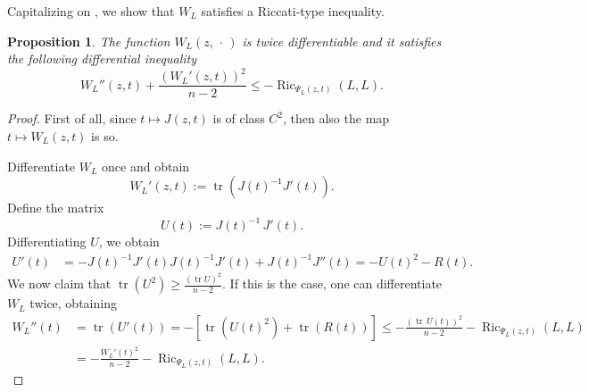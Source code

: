 \documentclass[12pt,a4paper]{amsart}
\theoremstyle{plain}
\newtheorem{proposition}[lemma]{Proposition}
\theoremstyle{definition}
\numberwithin{equation}{section}
\DeclareMathOperator{\Ric}{Ric}
\DeclareMathOperator{\tr}{tr}
\newcommand{\dotargument}{\,\cdot\,}
\newcommand{\gflow}{\Psi}
\begin{document}
Capitalizing on , 
we show that $W_{L}$ satisfies a
Riccati-type inequality.
%




\begin{proposition}
  \label{eq:riccati-for-jacobi}
  The function $W_{L}(z,\dotargument)$  is twice differentiable and it satisfies the following differential
  inequality
  \begin{equation}
    W_{L}''(z,t)
    +\frac{(W_{L}'(z,t))^2}{n-2}
    \leq
   - \Ric_{\gflow_L(z,t)}(L,L)
    .
  \end{equation}
\end{proposition}

\begin{proof}
First of all, since $t\mapsto J(z,t)$ is of class $C^2$, then also the map $t\mapsto W_L(z,t)$ is so.

Differentiate $W_{L}$ once and obtain
\begin{equation*}
  W_{L}'(z,t):=
  \tr(J(t)^{-1} J'(t))
  .
\end{equation*}
%
Define the matrix
\begin{equation*}
  U(t):=J(t)^{-1}\, J'(t)
  .
\end{equation*}
%
Differentiating $U$, we obtain
\begin{align}
  \label{eq:ode-for-U}
  U'(t)
  &=
    -J(t)^{-1}J'(t)
    J(t)^{-1}J'(t)
    + J(t)^{-1}
    J''(t)
    =
    - U(t)^2
    -R(t)
    .
\end{align}
%
We now claim that $\tr(U^2)\geq\frac{(\tr U)^2}{n-2}$.
%
If this is the case, one can differentiate $W_{L}$ twice, obtaining
\begin{align*}
  W_{L}''(t)
  &=
  \tr(U'(t))
  =
 -[\tr(U(t)^2)
  +
  \tr(R(t))]
     \leq
    - \frac{(\tr\, U(t))^2}
     {n-2}
     -
     \Ric_{\gflow_L(z,t)}(L,L)
  \\
   &
     =
    - \frac{W_{L}'(t)^2}{n-2}
     -
     \Ric_{\gflow_L(z,t)}(L,L)
     .
\end{align*}


\end{proof}
\end{document}
